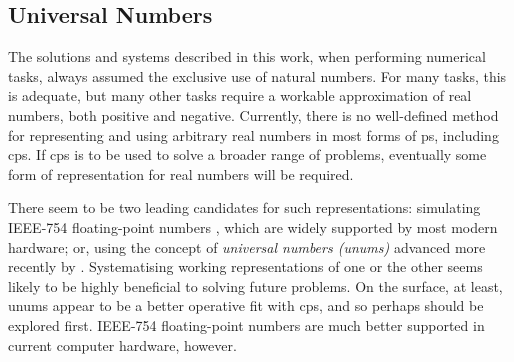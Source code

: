 

\subsection{Universal Numbers}

The solutions and systems described in this work, when performing numerical tasks, always assumed the exclusive use of natural numbers.  For many tasks, this is adequate, but many other tasks require a workable approximation of real numbers, both positive and negative.  Currently, there is no well-defined method for representing and using arbitrary real numbers in most forms of \gls{ps}, including \gls{cps}.  If \gls{cps} is to be used to solve a broader range of problems, eventually some form of representation for real numbers will be required.

There seem to be two leading candidates for such representations:  simulating IEEE-754 floating-point numbers \cite{ieee754}, which are widely supported by most modern hardware;  or, using the concept of \emph{universal numbers (unums)} advanced more recently by \citeauthor{Gustafson2017} \cite{Gustafson2017}.  Systematising working representations of one or the other seems likely to be highly beneficial to solving future problems.  On the surface, at least, unums appear to be a better operative fit with \gls{cps}, and so perhaps should be explored first.  IEEE-754 floating-point numbers are much better supported in current computer hardware, however.


